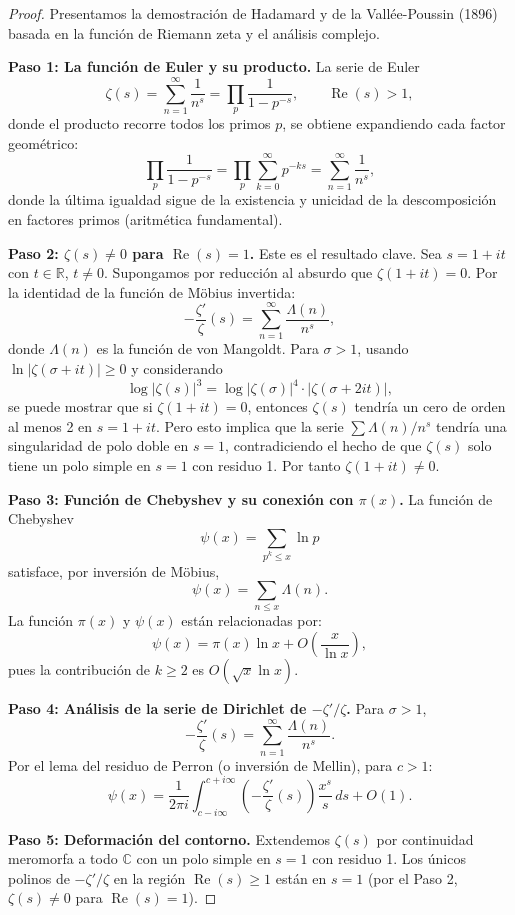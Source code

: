 \documentclass[11pt,a4paper]{article}
\theoremstyle{plain}
\theoremstyle{definition}
\begin{document}
\begin{proof}
Presentamos la demostración de Hadamard y de la Vallée-Poussin (1896) basada en la función de Riemann zeta y el análisis complejo.

\textbf{Paso 1: La función de Euler y su producto.} La serie de Euler
\[
\zeta(s)=\sum_{n=1}^{\infty}\frac{1}{n^{s}}=\prod_{p}\frac{1}{1-p^{-s}},\qquad\operatorname{Re}(s)>1,
\]
donde el producto recorre todos los primos $p$, se obtiene expandiendo cada factor geométrico:
\[
\prod_{p}\frac{1}{1-p^{-s}}=\prod_{p}\sum_{k=0}^{\infty}p^{-ks}=\sum_{n=1}^{\infty}\frac{1}{n^{s}},
\]
donde la última igualdad sigue de la existencia y unicidad de la descomposición en factores primos (aritmética fundamental).

\textbf{Paso 2: $\zeta(s)\neq 0$ para $\operatorname{Re}(s)=1$.} Este es el resultado clave. Sea $s=1+it$ con $t\in\mathbb{R}$, $t\neq 0$. Supongamos por reducción al absurdo que $\zeta(1+it)=0$. Por la identidad de la función de Möbius invertida:
\[
-\frac{\zeta'}{\zeta}(s)=\sum_{n=1}^{\infty}\frac{\Lambda(n)}{n^{s}},
\]
donde $\Lambda(n)$ es la función de von Mangoldt. Para $\sigma>1$, usando $\ln|\zeta(\sigma+it)|\ge 0$ y considerando
\[
\log|\zeta(s)|^{3}=\log|\zeta(\sigma)|^{4}\cdot|\zeta(\sigma+2it)|,
\]
se puede mostrar que si $\zeta(1+it)=0$, entonces $\zeta(s)$ tendría un cero de orden al menos 2 en $s=1+it$. Pero esto implica que la serie $\sum\Lambda(n)/n^{s}$ tendría una singularidad de polo doble en $s=1$, contradiciendo el hecho de que $\zeta(s)$ solo tiene un polo simple en $s=1$ con residuo 1. Por tanto $\zeta(1+it)\neq 0$.

\textbf{Paso 3: Función de Chebyshev y su conexión con $\pi(x)$.} La función de Chebyshev
\[
\psi(x)=\sum_{p^{k}\le x}\ln p
\]
satisface, por inversión de Möbius,
\[
\psi(x)=\sum_{n\le x}\Lambda(n).
\]
La función $\pi(x)$ y $\psi(x)$ están relacionadas por:
\[
\psi(x)=\pi(x)\ln x+O\!\left(\frac{x}{\ln x}\right),
\]
pues la contribución de $k\ge 2$ es $O(\sqrt{x}\ln x)$.

\textbf{Paso 4: Análisis de la serie de Dirichlet de $-\zeta'/\zeta$.} Para $\sigma>1$,
\[
-\frac{\zeta'}{\zeta}(s)=\sum_{n=1}^{\infty}\frac{\Lambda(n)}{n^{s}}.
\]
Por el lema del residuo de Perron (o inversión de Mellin), para $c>1$:
\[
\psi(x)=\frac{1}{2\pi i}\int_{c-i\infty}^{c+i\infty}\left(-\frac{\zeta'}{\zeta}(s)\right)\frac{x^{s}}{s}\,ds+O(1).
\]

\textbf{Paso 5: Deformación del contorno.} Extendemos $\zeta(s)$ por continuidad meromorfa a todo $\mathbb{C}$ con un polo simple en $s=1$ con residuo 1. Los únicos polinos de $-\zeta'/\zeta$ en la región $\operatorname{Re}(s)\ge 1$ están en $s=1$ (por el Paso 2, $\zeta(s)\neq 0$ para $\operatorname{Re}(s)=1$).


\end{proof}
\end{document}
